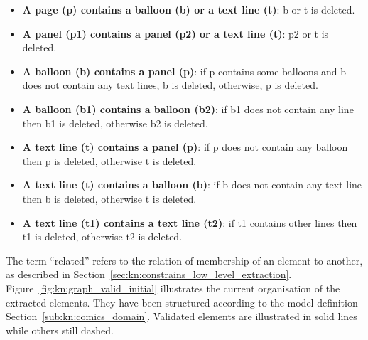 \begin{itemize}
  \item \textbf{A page (p) contains a balloon (b) or a text line (t)}: b or t is deleted.
  \item \textbf{A panel (p1) contains a panel (p2) or a text line (t)}: p2 or t is deleted.
  \item \textbf{A balloon (b) contains a panel (p)}: if p contains some balloons and b does not contain any text lines, b is deleted, otherwise, p is deleted.
  \item \textbf{A balloon (b1) contains a balloon (b2)}: if b1 does not contain any line then b1 is deleted, otherwise b2 is deleted.
  \item \textbf{A text line (t) contains a panel (p)}: if p does not contain any balloon then p is deleted, otherwise t is deleted.
  \item \textbf{A text line (t) contains a balloon (b)}: if b does not contain any text line then b is deleted, otherwise t is deleted.
  \item \textbf{A text line (t1) contains a text line (t2)}: if t1 contains other lines then t1 is deleted, otherwise t2 is deleted.
\end{itemize}

The term ``related'' refers to the relation of membership of an element to another, as described in Section~\ref{sec:kn:constrains_low_level_extraction}.
Figure~\ref{fig:kn:graph_valid_initial} illustrates the current organisation of the extracted elements.
They have been structured according to the model definition Section~\ref{sub:kn:comics_domain}.
Validated elements are illustrated in solid lines while others still dashed.


